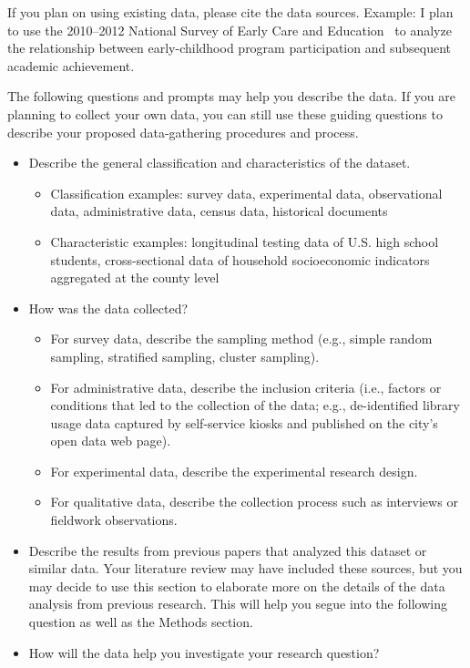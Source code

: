 If you plan on using existing data, please cite the data sources. Example: I plan to use the 2010--2012 National Survey of Early Care and Education~\citep{Center2019} to analyze the relationship between early-childhood program participation and subsequent academic achievement.

The following questions and prompts may help you describe the data. If you are planning to collect your own data, you can still use these guiding questions to describe your proposed data-gathering procedures and process.

\begin{itemize}
\item Describe the general classification and characteristics of the dataset.
    \begin{itemize}
    \item Classification examples: survey data, experimental data, observational data, administrative data, census data, historical documents
    \item Characteristic examples: longitudinal testing data of U.S. high school students, cross-sectional data of household socioeconomic indicators aggregated at the county level
    \end{itemize}

\item How was the data collected?
    \begin{itemize}
    \item For survey data, describe the sampling method (e.g., simple random sampling, stratified sampling, cluster sampling).
    \item For administrative data, describe the inclusion criteria (i.e., factors or conditions that led to the collection of the data; e.g., de-identified library usage data captured by self-service kiosks and published on the city's open data web page).
    \item For experimental data, describe the experimental research design.
    \item For qualitative data, describe the collection process such as interviews or fieldwork observations.
    \end{itemize}

\item Describe the results from previous papers that analyzed this dataset or similar data. Your literature review may have included these sources, but you may decide to use this section to elaborate more on the details of the data analysis from previous research. This will help you segue into the following question as well as the Methods section.

\item How will the data help you investigate your research question?

\end{itemize}

